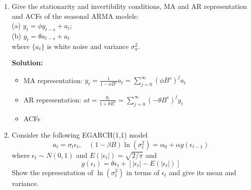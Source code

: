 \documentclass{article}
\begin{document}
\begin{enumerate}
	\item Give the stationarity and invertibility conditions, MA and AR representation and ACFs of the seasonal ARMA models:\\
	(a) $y_{t}=\phi y_{t-s}+a_{t};$\\
	(b) $y_{t}=\theta a_{t-s}+a_{t}$\\
	where $\{a_t\}$ is white noise and variance $\sigma_a^2$.
	
	\textbf{Solution:}
	\begin{itemize}
		\item MA representation: $y_{t}=\frac{1}{1-\phi B^{s}} a_{t}=\sum_{j=0}^{\infty}\left(\phi B^{s}\right)^{j} a_{t}$
		\item AR representation: $a t=\frac{y_{t}}{1+\theta B^{s}}=\sum_{j=0}^{\infty}\left(-\theta B^{s}\right)^{j} y_{t}$
		\item ACFs
	\end{itemize}
	
	\item Consider the following EGARCH(1,1) model
	\begin{equation*}
	a_{t}=\sigma_{t} \epsilon_{t}, \quad(1-\beta B) \ln \left(\sigma_{t}^{2}\right)=\alpha_{0}+\alpha g\left(\epsilon_{t-1}\right)
	\end{equation*}
	where $\epsilon_{t} \sim N(0,1)$ and $E\left(\left|\epsilon_{t}\right|\right)=\sqrt{2 / \pi}$ and
	\begin{equation*}
	g\left(\epsilon_{t}\right)=\theta \epsilon_{t}+\left[\left|\epsilon_{t}\right|-E\left(\left|\epsilon_{t}\right|\right)\right]
	\end{equation*}
	Show the representation of $\ln(\sigma_t^2)$ in terms of $\epsilon_t$ and give its mean and variance.
	

\end{enumerate}
\end{document}
